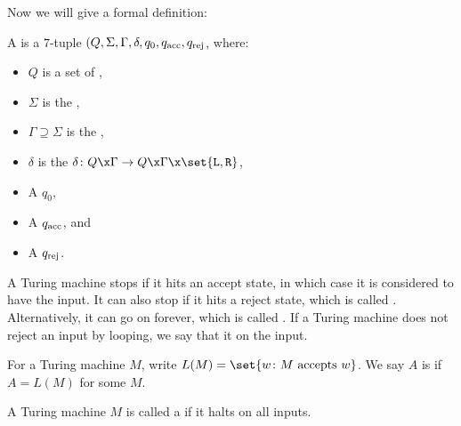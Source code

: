 Now we will give a formal definition:

\begin{defn}
	A  is a $7$-tuple $(Q, \Sigma, \Gamma, \delta, q_0, q_{\textnormal{acc}}, q_{\textnormal{rej}}$, where:
	\begin{itemize}
		\item $Q$ is a set of ,
		\item $\Sigma$ is the ,
		\item $\Gamma \supseteq \Sigma$ is the ,
		\item $\delta$ is the  $\delta \colon Q\x \Gamma \to Q\x \Gamma \x \set{\textnormal{\texttt{L}}, \textnormal{\texttt{R}}}$,
		\item A  $q_0$,
		\item A  $q_{\textnormal{acc}}$, and
		\item A  $q_{\textnormal{rej}}$.
	\end{itemize}
	A Turing machine stops if it hits an accept state, in which case it is considered to have  the input. It can also stop if it hits a reject state, which is called .
	Alternatively, it can go on forever, which is called . If a Turing machine does not reject an input by looping, we say that it  on the input.
\end{defn}

\begin{defn}
	For a Turing machine $M$, write $L(M) = \set{w\colon M \textnormal{ accepts }w}$.
	We say $A$ is  if $A = L(M)$ for some $M$.
\end{defn}

\begin{defn}
	A Turing machine $M$ is called a  if it halts on all inputs.
\end{defn}
